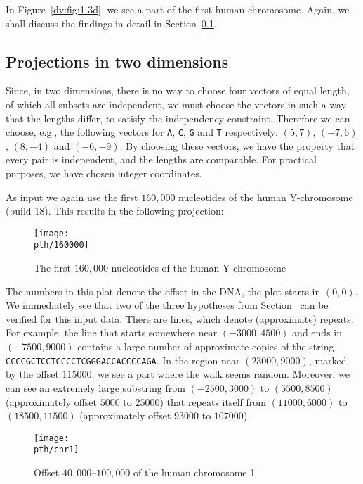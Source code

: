 \documentclass[oribibl]{lncs/llncs}
\begin{document}
In Figure~\ref{dv:fig:1-3d}, we see a part of the first human chromosome.
Again, we shall discuss the findings in detail in Section~\ref{dv:subsec:ex2d}.

\subsection{Projections in two dimensions}\label{dv:subsec:ex2d}
Since, in two dimensions, there is no way to choose four vectors of equal
length, of which all subsets are independent, we must choose the vectors in
such a way that the lengths differ, to satisfy the independency constraint.
Therefore we can choose, e.g., the following vectors for \texttt{A}, \texttt{C},
\texttt{G} and \texttt{T} respectively: $(5, 7)$, $(-7, 6)$, $(8, -4)$ and
$(-6,-9)$. By choosing these vectors, we have the property that every pair is
independent, and the lengths are comparable. For practical purposes, we have
chosen integer coordinates.

As input we again use the first $160,\!000$ nucleotides of the human
Y-chromosome~\cite{GN} (build 18). This results in the following projection:

\begin{figure}[H]
\begin{center}
\texttt{[image: \\pth/160000]}
\caption{The first $160,\!000$ nucleotides of the human Y-chromosome}
\label{dv:fig:160000}
\end{center}
\vspace*{-5mm}
\end{figure}

The numbers in this plot denote the offset in the DNA, the plot starts in $(0,
0)$. We immediately see that two of the three hypotheses from
Section~\paper{\ref{dv:sec:ell}}\thesis{\ref{dv:sec:dna}} can be verified for
this input data. There are lines, which denote (approximate) repeats. For
example, the line that starts somewhere near $(-3000, 4500)$ and ends in
$(-7500, 9000)$ contains a large number of approximate copies of the string
\texttt{CCCCGCTCCTCCCCTCGGGACCACCCCAGA}. In the region near $(23000, 9000)$,
marked by the offset $115000$, we see a part where the walk seems random.
Moreover, we can see an extremely large substring from $(-2500, 3000)$ to
$(5500, 8500)$ (approximately offset $5000$ to $25000$) that repeats itself
from $(11000, 6000)$ to $(18500, 11500)$ (approximately offset $93000$ to
$107000$).

\begin{figure}[H]
\begin{center}
\texttt{[image: \\pth/chr1]}
\caption{Offset $40,\!000$--$100,\!000$ of the human chromosome 1}
\label{dv:fig:chr1}
\end{center}
\vspace*{-5mm}
\end{figure}
\end{document}
